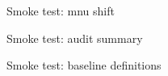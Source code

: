 \documentclass{article}
\begin{document}
\begin{table}[h]
\centering

\caption{Smoke test: mnu shift}
\end{table}
\begin{table}[h]
\centering

\caption{Smoke test: audit summary}
\end{table}
\begin{table}[h]
\centering

\caption{Smoke test: baseline definitions}
\end{table}
\end{document}

